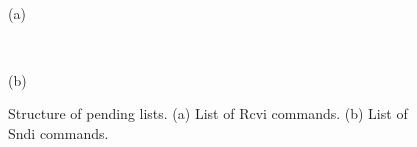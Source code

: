 \begin{figure}
\setlength{\tabcolsep}{7pt}
\scalebox{0.68}{\usebox{\boxReviList}} \\
\begin{center}
(a)
\end{center}


\scalebox{0.68}{\usebox{\boxSendiList}} \\
\begin{center}
(b)
\end{center}
\caption{Structure of pending lists. (a) List of Rcvi commands. (b) List of Sndi commands.}
\label{fig:data-structure-pendinglist}
\end{figure}


